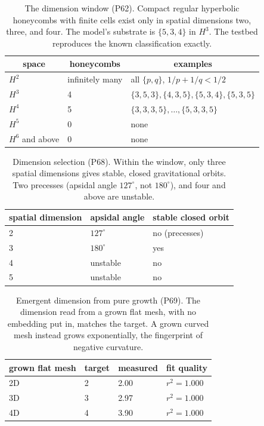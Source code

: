 \begin{table}[H]
\centering
\small
\begin{tabular}{lll}
\toprule
\multicolumn{1}{c}{space} & \multicolumn{1}{c}{honeycombs} & \multicolumn{1}{c}{examples} \\
\midrule
$H^2$ & infinitely many & all $\{p,q\}$, $1/p+1/q<1/2$ \\
$H^3$ & 4 & $\{3,5,3\}, \{4,3,5\}, \{5,3,4\}, \{5,3,5\}$ \\
$H^4$ & 5 & $\{3,3,3,5\}, \ldots, \{5,3,3,5\}$ \\
$H^5$ & 0 & none \\
$H^6$ and above & 0 & none \\
\bottomrule
\end{tabular}
\caption{The dimension window (P62). Compact regular hyperbolic honeycombs with finite cells exist only in spatial dimensions two, three, and four. The model's substrate is $\{5,3,4\}$ in $H^3$. The testbed reproduces the known classification exactly.}
\end{table}

\begin{table}[H]
\centering
\small
\begin{tabular}{lll}
\toprule
\multicolumn{1}{c}{spatial dimension} & \multicolumn{1}{c}{apsidal angle} & \multicolumn{1}{c}{stable closed orbit} \\
\midrule
2 & $127^\circ$ & no (precesses) \\
3 & $180^\circ$ & yes \\
4 & unstable & no \\
5 & unstable & no \\
\bottomrule
\end{tabular}
\caption{Dimension selection (P68). Within the window, only three spatial dimensions gives stable, closed gravitational orbits. Two precesses (apsidal angle $127^\circ$, not $180^\circ$), and four and above are unstable.}
\end{table}

\begin{table}[H]
\centering
\small
\begin{tabular}{llll}
\toprule
\multicolumn{1}{c}{grown flat mesh} & \multicolumn{1}{c}{target} & \multicolumn{1}{c}{measured} & \multicolumn{1}{c}{fit quality} \\
\midrule
2D & 2 & 2.00 & $r^2 = 1.000$ \\
3D & 3 & 2.97 & $r^2 = 1.000$ \\
4D & 4 & 3.90 & $r^2 = 1.000$ \\
\bottomrule
\end{tabular}
\caption{Emergent dimension from pure growth (P69). The dimension read from a grown flat mesh, with no embedding put in, matches the target. A grown curved mesh instead grows exponentially, the fingerprint of negative curvature.}
\end{table}

